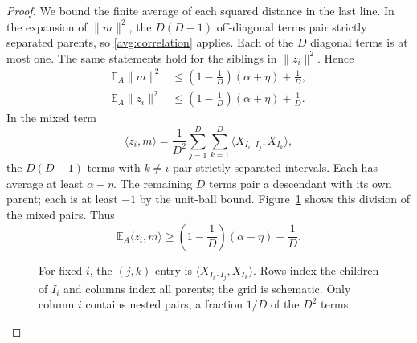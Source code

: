 \documentclass[11pt]{article}
\newcommand{\norm}[1]{\lVert #1\rVert}
\newcommand{\ip}[2]{\langle #1,#2\rangle}
\theoremstyle{definition}
\numberwithin{equation}{section}
\begin{document}
\begin{proof}
We bound the finite average of each squared distance in the last
line.  In the expansion of $\norm{m}^2$, the $D(D-1)$
off-diagonal terms pair strictly separated parents, so
\eqref{avg:correlation} applies.  Each of the $D$ diagonal terms
is at most one.  The same statements hold for the siblings in
$\norm{z_i}^2$.  Hence
\begin{align}
  \mathbb E_A\norm{m}^2
       &\leq\left(1-\frac1D\right)(\alpha+\eta)+\frac1D,
       \label{avg:parent-bound}\\
  \mathbb E_A\norm{z_i}^2
       &\leq\left(1-\frac1D\right)(\alpha+\eta)+\frac1D.
       \label{avg:child-bound}
\end{align}
In the mixed term
\[
  \ip{z_i}{m}
    =\frac1{D^2}\sum_{j=1}^D\sum_{k=1}^D
                  \ip{X_{I_i\cdot I_j}}{X_{I_k}},
\]
the $D(D-1)$ terms with $k\ne i$ pair strictly separated
intervals.  Each has average at least $\alpha-\eta$.
The remaining $D$ terms pair a descendant with its own parent;
each is at least $-1$ by the unit-ball bound.  Figure~\ref{fig:mixed-pairs}
shows this division of the mixed pairs.  Thus
\begin{equation}\label{avg:mixed-bound}
  \mathbb E_A\ip{z_i}{m}
    \geq\left(1-\frac1D\right)(\alpha-\eta)-\frac1D.
\end{equation}
\begin{figure}[tbp]
\centering
{}
\caption{For fixed \(i\), the \((j,k)\) entry is
\(\ip{X_{I_i\cdot I_j}}{X_{I_k}}\). Rows index the children of
\(I_i\) and columns index all parents; the grid is schematic.
Only column \(i\) contains nested pairs, a fraction \(1/D\) of the
\(D^2\) terms.}
\label{fig:mixed-pairs}
\end{figure}


\end{proof}
\end{document}
